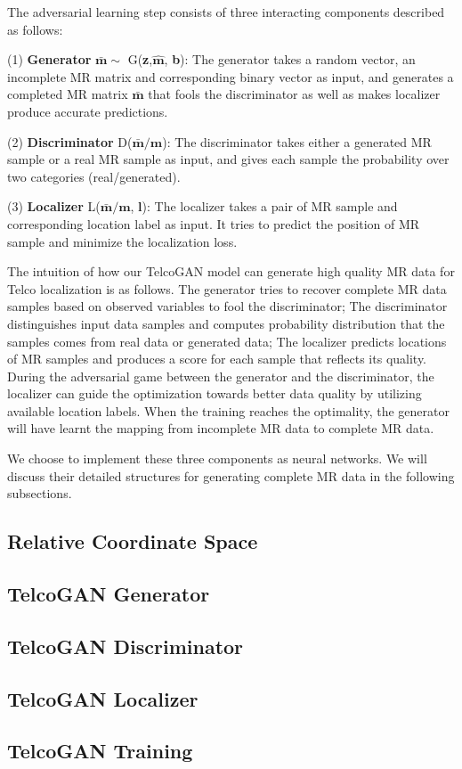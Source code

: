 The adversarial learning step consists of three interacting components described as follows:

(1) \textbf{Generator} $\bar{\textbf{m}}\sim$ G(\textbf{z},$\hat{\textbf{m}}$, \textbf{b}): The generator takes a random vector, an incomplete MR matrix and corresponding binary vector as input, and generates a completed MR matrix $\bar{\textbf{m}}$ that fools the discriminator as well as makes localizer produce accurate predictions.

(2) \textbf{Discriminator} D($\bar{\textbf{m}}/\textbf{m}$): The discriminator takes either a generated MR sample or a real MR sample as input, and gives each sample the probability over two categories (real/generated).

(3) \textbf{Localizer} L($\bar{\textbf{m}}/\textbf{m}$, $\textbf{l}$): The localizer takes a pair of MR sample and corresponding location label as input. It tries to predict the position of MR sample and minimize the localization loss.

The intuition of how our TelcoGAN model can generate high quality MR data for Telco localization is as follows. The generator tries to recover complete MR data samples based on observed variables to fool the discriminator; The discriminator distinguishes input data samples and computes probability distribution that the samples comes from real data or generated data; The localizer predicts locations of MR samples and produces a score for each sample that reflects its quality. During the adversarial game between the generator and the discriminator, the localizer can guide the optimization towards better data quality by utilizing available location labels. When the training reaches the optimality, the generator will have learnt the mapping from incomplete MR data to complete MR data.

We choose to implement these three components as neural networks. We will discuss their detailed structures for generating complete MR data in the following subsections.


\subsection{Relative Coordinate Space}

\subsection{TelcoGAN Generator}

\subsection{TelcoGAN Discriminator}

\subsection{TelcoGAN Localizer}

\subsection{TelcoGAN Training}
